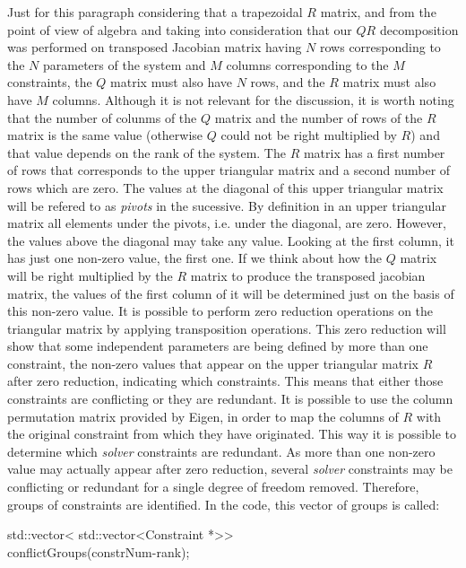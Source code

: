 \documentclass[12pt,twoside,a4paper]{book}
\begin{document}
    Just for this paragraph considering that a trapezoidal $R$ matrix, and from the point of view of algebra and taking into consideration that our $QR$ decomposition was performed on transposed Jacobian matrix having $N$ rows corresponding to the $N$ parameters of the system and $M$ columns corresponding to the $M$ constraints, the $Q$ matrix must also have $N$ rows, and the $R$ matrix must also have $M$ columns. Although it is not relevant for the discussion, it is worth noting that the number of colunms of the $Q$ matrix and the number of rows of the $R$ matrix is the same value (otherwise $Q$ could not be right multiplied by $R$) and that value depends on the rank of the system. The $R$ matrix has a first number of rows that corresponds to the upper triangular matrix and a second number of rows which are zero. The values at the diagonal of this upper triangular matrix will be refered to as \emph{pivots} in the sucessive. By definition in an upper triangular matrix all elements under the pivots, i.e. under the diagonal, are zero. However, the values above the diagonal may take any value. Looking at the first column, it has just one non-zero value, the first one. If we think about how the $Q$ matrix will be right multiplied by the $R$ matrix to produce the transposed jacobian matrix, the values of the first column of it will be determined just on the basis of this non-zero value. It is possible to perform zero reduction operations on the triangular matrix by applying transposition operations. This zero reduction will show that some independent parameters are being defined by more than one constraint, the non-zero values that appear on the upper triangular matrix $R$ after zero reduction, indicating which constraints. This means that either those constraints are conflicting or they are redundant. It is possible to use the column permutation matrix provided by Eigen, in order to map the columns of $R$ with the original constraint from which they have originated. This way it is possible to determine which \emph{solver} constraints are redundant. As more than one non-zero value may actually appear after zero reduction, several \emph{solver} constraints may be conflicting or redundant for a single degree of freedom removed. Therefore, groups of constraints are identified. In the code, this vector of groups is called:

\begin{codequote}
    std::vector\textless{} std::vector\textless{}Constraint *\textgreater{}\textgreater{}\\ \-\hspace{4cm}conflictGroups(constrNum-rank);
\end{codequote}
\end{document}
